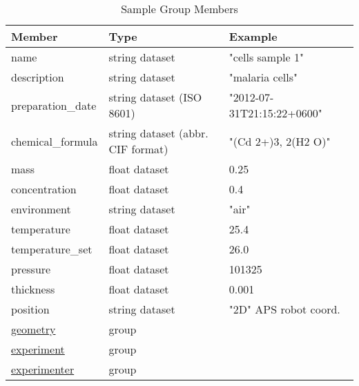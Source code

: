\begin{table}[h!]\sffamily \footnotesize
\centering
\caption{Sample Group Members}
\begin{tabular}{l l l}
\toprule
\bfseries Member     & \bfseries Type & \bfseries Example \\
\midrule
name & string dataset &  "cells sample 1" \\     
description & string dataset &  "malaria cells" \\   
preparation\_date  & string dataset (ISO 8601) & "2012-07-31T21:15:22+0600" \\    
chemical\_formula  & string dataset (abbr. CIF format) & "(Cd 2+)3,  2(H2 O)" \\   
mass & float dataset & 0.25 \\
concentration & float dataset & 0.4 \\
environment & string dataset & "air" \\  
temperature     & float dataset & 25.4  \\
temperature\_set & float dataset & 26.0 \\
pressure & float dataset &  101325 \\ 
thickness & float dataset & 0.001 \\
position & string dataset & "2D"  APS robot coord. \\
\hyperref[table:geometry]{geometry} &  group & \\
\hyperref[table:experiment]{experiment} & group & \\
\hyperref[table:experimenter]{experimenter} & group & \\
\bottomrule
\end{tabular}
\end{table}

